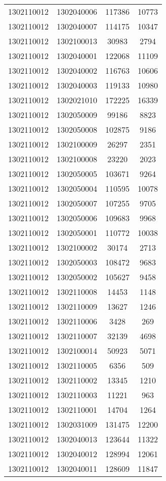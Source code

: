 \begin{longtable}{llcc}
1302110012 & 1302040006 & 117386 & 10773\\
1302110012 & 1302040007 & 114175 & 10347\\
1302110012 & 1302100013 & 30983 & 2794\\
1302110012 & 1302040001 & 122068 & 11109\\
1302110012 & 1302040002 & 116763 & 10606\\
1302110012 & 1302040003 & 119133 & 10980\\
1302110012 & 1302021010 & 172225 & 16339\\
1302110012 & 1302050009 & 99186 & 8823\\
1302110012 & 1302050008 & 102875 & 9186\\
1302110012 & 1302100009 & 26297 & 2351\\
1302110012 & 1302100008 & 23220 & 2023\\
1302110012 & 1302050005 & 103671 & 9264\\
1302110012 & 1302050004 & 110595 & 10078\\
1302110012 & 1302050007 & 107255 & 9705\\
1302110012 & 1302050006 & 109683 & 9968\\
1302110012 & 1302050001 & 110772 & 10038\\
1302110012 & 1302100002 & 30174 & 2713\\
1302110012 & 1302050003 & 108472 & 9683\\
1302110012 & 1302050002 & 105627 & 9458\\
1302110012 & 1302110008 & 14453 & 1148\\
1302110012 & 1302110009 & 13627 & 1246\\
1302110012 & 1302110006 & 3428 & 269\\
1302110012 & 1302110007 & 32139 & 4698\\
1302110012 & 1302100014 & 50923 & 5071\\
1302110012 & 1302110005 & 6356 & 509\\
1302110012 & 1302110002 & 13345 & 1210\\
1302110012 & 1302110003 & 11221 & 963\\
1302110012 & 1302110001 & 14704 & 1264\\
1302110012 & 1302031009 & 131475 & 12200\\
1302110012 & 1302040013 & 123644 & 11322\\
1302110012 & 1302040012 & 128994 & 12061\\
1302110012 & 1302040011 & 128609 & 11847\\

\end{longtable}
